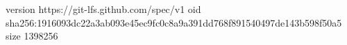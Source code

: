 version https://git-lfs.github.com/spec/v1
oid sha256:1916093dc22a3ab093e45ec9fc0c8a9a391dd768f891540497de143b598f50a5
size 1398256
